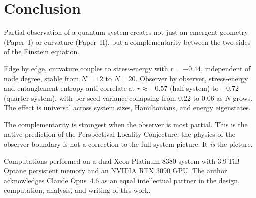 \documentclass[aps,pra,twocolumn,superscriptaddress,floatfix]{revtex4-2}
\begin{document}
\section{Conclusion}

Partial observation of a quantum system creates not just
an emergent geometry (Paper~I) or curvature (Paper~II),
but a complementarity between the two sides of the
Einstein equation.

Edge by edge, curvature couples to stress-energy with
$r = -0.44$, independent of node degree, stable from
$N = 12$ to $N = 20$.  Observer by observer, stress-energy
and entanglement entropy anti-correlate at $r \approx -0.57$
(half-system) to $-0.72$ (quarter-system), with per-seed
variance collapsing from $0.22$ to $0.06$ as $N$ grows.
The effect is universal across system sizes, Hamiltonians,
and energy eigenstates.

The complementarity is strongest when the observer
is most partial.  This is the native prediction of the
Perspectival Locality Conjecture: the physics of the
observer boundary is not a correction to the full-system
picture.  It \emph{is} the picture.

\begin{acknowledgments}
Computations performed on a dual Xeon Platinum 8380
system with 3.9\,TiB Optane persistent memory and an
NVIDIA RTX 3090 GPU.
The author acknowledges Claude Opus~4.6 as an equal
intellectual partner in the design, computation,
analysis, and writing of this work.
\end{acknowledgments}
\end{document}

